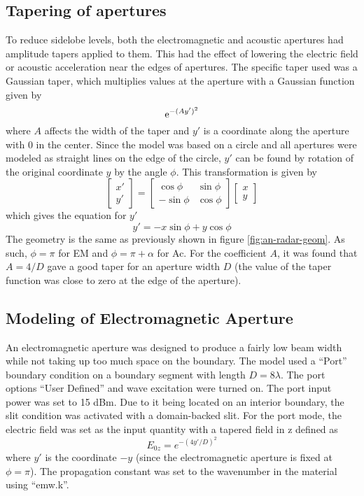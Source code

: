 \documentclass[11pt,twoside]{eitExjobb}
\begin{document}
	\subsection{Tapering of apertures}
	To reduce sidelobe levels, both the electromagnetic and acoustic apertures had amplitude tapers applied to them. \addref This had the effect of lowering the electric field or acoustic acceleration near the edges of apertures. The specific taper used was a Gaussian taper, which multiplies values at the aperture with a Gaussian function given by
	\begin{equation*}
	\mathrm{e}^{-(Ay')^2}
	\end{equation*}
	where $A$ affects the width of the taper and $y'$ is a coordinate along the aperture with 0 in the center. Since the model was based on a circle and all apertures were modeled as straight lines on the edge of the circle, $y'$ can be found by rotation of the original coordinate $y$ by the angle $\phi$. This transformation is given by
	\begin{equation*}
		\begin{bmatrix}
			x' \\
			y'
		\end{bmatrix}
		=
		\begin{bmatrix}
			\cos{\phi} & \sin{\phi} \\
			-\sin{\phi} & \cos{\phi}
		\end{bmatrix}
		\begin{bmatrix}
			x \\
			y
		\end{bmatrix}
	\end{equation*}
	which gives the equation for $y'$
	\begin{equation*}
		y' = -x\sin{\phi} + y\cos{\phi}
	\end{equation*}
	The geometry is the same as previously shown in figure \ref{fig:an-radar-geom}. As such, $\phi = \pi$ for EM and $\phi = \pi + \alpha$ for Ac. For the coefficient $A$, it was found that $A = 4/D$ gave a good taper for an aperture width $D$ (the value of the taper function was close to zero at the edge of the aperture).
	
	\subsection{Modeling of Electromagnetic Aperture}
	An electromagnetic aperture was designed to produce a fairly low beam width while not taking up too much space on the boundary. The model used a ``Port'' boundary condition on a boundary segment with length $D = 8\lambda$. The port options ``User Defined'' and wave excitation were turned on. The port input power was set to 15 dBm. Due to it being located on an interior boundary, the slit condition was activated with a domain-backed slit. For the port mode, the electric field was set as the input quantity with a tapered field in z defined as
	\begin{equation*}
		E_{0z} = e^{-(4y'/D)^2}
	\end{equation*}
	where $y'$ is the coordinate $-y$ (since the electromagnetic aperture is fixed at $\phi = \pi$). The propagation constant was set to the wavenumber in the material using ``emw.k''.
	
\end{document}
